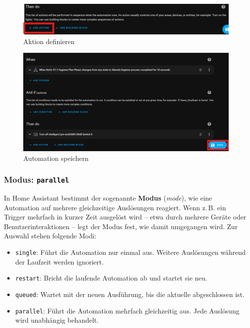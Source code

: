 \begin{figure}[H]
    \centering
    \includegraphics[width=0.7\linewidth]{images/auto_addaction.png}
    \caption{Aktion definieren}
    \label{fig:auto_addaction}
\end{figure}

\begin{figure}[H]
    \centering
    \includegraphics[width=0.7\linewidth]{images/auto_save.png}
    \caption{Automation speichern}
    \label{fig:auto_save}
\end{figure}


\subsubsection{Modus: \texttt{parallel}}

In Home Assistant bestimmt der sogenannte \textbf{Modus} (\textit{mode}), wie eine Automation auf mehrere gleichzeitige Auslösungen reagiert. Wenn z.\,B. ein Trigger mehrfach in kurzer Zeit ausgelöst wird – etwa durch mehrere Geräte oder Benutzerinteraktionen – legt der Modus fest, wie damit umgegangen wird. Zur Auswahl stehen folgende Modi:
\begin{itemize}
  \item \texttt{single}: Führt die Automation nur einmal aus. Weitere Auslösungen während der Laufzeit werden ignoriert.\\
  \item \texttt{restart}: Bricht die laufende Automation ab und startet sie neu.\\
  \item \texttt{queued}: Wartet mit der neuen Ausführung, bis die aktuelle abgeschlossen ist.\\
  \item \texttt{parallel}: Führt die Automation mehrfach gleichzeitig aus. Jede Auslösung wird unabhängig behandelt.
\end{itemize}


